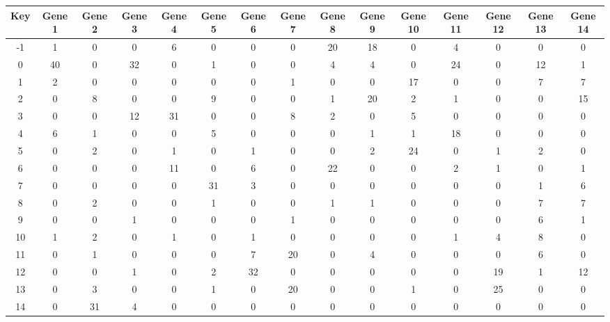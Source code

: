 \begin{tabular}{|c|c|c|c|c|c|c|c|c|c|c|c|c|c|c|}
\hline
Key & Gene 1 & Gene 2 & Gene 3 & Gene 4 & Gene 5 & Gene 6 & Gene 7 & Gene 8 & Gene 9 & Gene 10 & Gene 11 & Gene 12 & Gene 13 & Gene 14 \\
\hline
-1 & 1 & 0 & 0 & 6 & 0 & 0 & 0 & 20 & 18 & 0 & 4 & 0 & 0 & 0 \\
0 & 40 & 0 & 32 & 0 & 1 & 0 & 0 & 4 & 4 & 0 & 24 & 0 & 12 & 1 \\
1 & 2 & 0 & 0 & 0 & 0 & 0 & 1 & 0 & 0 & 17 & 0 & 0 & 7 & 7 \\
2 & 0 & 8 & 0 & 0 & 9 & 0 & 0 & 1 & 20 & 2 & 1 & 0 & 0 & 15 \\
3 & 0 & 0 & 12 & 31 & 0 & 0 & 8 & 2 & 0 & 5 & 0 & 0 & 0 & 0 \\
4 & 6 & 1 & 0 & 0 & 5 & 0 & 0 & 0 & 1 & 1 & 18 & 0 & 0 & 0 \\
5 & 0 & 2 & 0 & 1 & 0 & 1 & 0 & 0 & 2 & 24 & 0 & 1 & 2 & 0 \\
6 & 0 & 0 & 0 & 11 & 0 & 6 & 0 & 22 & 0 & 0 & 2 & 1 & 0 & 1 \\
7 & 0 & 0 & 0 & 0 & 31 & 3 & 0 & 0 & 0 & 0 & 0 & 0 & 1 & 6 \\
8 & 0 & 2 & 0 & 0 & 1 & 0 & 0 & 1 & 1 & 0 & 0 & 0 & 7 & 7 \\
9 & 0 & 0 & 1 & 0 & 0 & 0 & 1 & 0 & 0 & 0 & 0 & 0 & 6 & 1 \\
10 & 1 & 2 & 0 & 1 & 0 & 1 & 0 & 0 & 0 & 0 & 1 & 4 & 8 & 0 \\
11 & 0 & 1 & 0 & 0 & 0 & 7 & 20 & 0 & 4 & 0 & 0 & 0 & 6 & 0 \\
12 & 0 & 0 & 1 & 0 & 2 & 32 & 0 & 0 & 0 & 0 & 0 & 19 & 1 & 12 \\
13 & 0 & 3 & 0 & 0 & 1 & 0 & 20 & 0 & 0 & 1 & 0 & 25 & 0 & 0 \\
14 & 0 & 31 & 4 & 0 & 0 & 0 & 0 & 0 & 0 & 0 & 0 & 0 & 0 & 0 \\
\hline
\end{tabular}